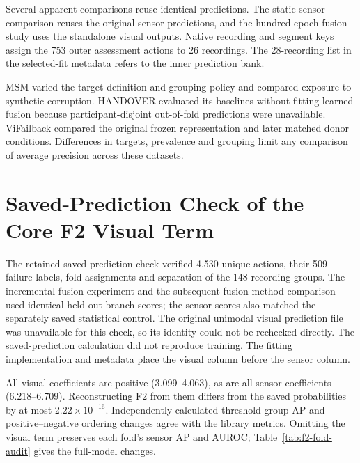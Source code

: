 Several apparent comparisons reuse identical predictions. The static-sensor comparison reuses the
original sensor predictions, and the hundred-epoch fusion study uses the standalone visual
outputs. Native recording and segment keys assign the 753 outer assessment actions to 26
recordings. The 28-recording list in the selected-fit metadata refers to the inner
prediction bank.

MSM varied the target definition and grouping policy and compared exposure to synthetic
corruption. HANDOVER evaluated its baselines without fitting learned fusion because
participant-disjoint out-of-fold predictions were unavailable. ViFailback compared the
original frozen representation and later matched donor conditions. Differences in
targets, prevalence and grouping limit any comparison of average precision across these
datasets.

\section{Saved-Prediction Check of the Core F2 Visual Term}
The retained saved-prediction check verified 4,530 unique actions, their 509 failure
labels, fold assignments and separation of the 148 recording groups. The incremental-fusion experiment
and the subsequent fusion-method comparison used identical held-out branch scores;
the sensor scores also matched the separately saved statistical control. The original
unimodal visual prediction file was unavailable for this check, so its identity could
not be rechecked directly. The saved-prediction calculation did not reproduce training.
The fitting implementation and metadata place the visual column before the sensor column.

All visual coefficients are positive (3.099--4.063), as are all sensor coefficients
(6.218--6.709). Reconstructing F2 from them differs from the saved probabilities by at
most $2.22\times10^{-16}$. Independently calculated threshold-group AP and
positive--negative ordering changes agree with the library metrics. Omitting the visual
term preserves each fold's sensor AP and AUROC; Table~\ref{tab:f2-fold-audit} gives the
full-model changes.

